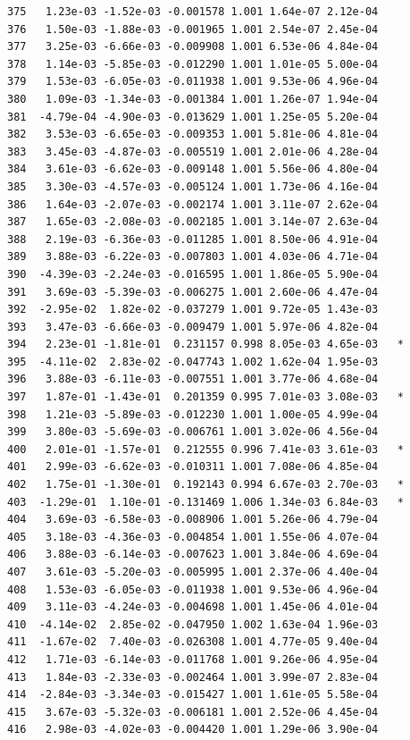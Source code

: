 \documentclass[
  letterpaper,
  DIV=11,
  numbers=noendperiod]{scrartcl}
\begin{document}
\begin{verbatim}
375   1.23e-03 -1.52e-03 -0.001578 1.001 1.64e-07 2.12e-04    
376   1.50e-03 -1.88e-03 -0.001965 1.001 2.54e-07 2.45e-04    
377   3.25e-03 -6.66e-03 -0.009908 1.001 6.53e-06 4.84e-04    
378   1.14e-03 -5.85e-03 -0.012290 1.001 1.01e-05 5.00e-04    
379   1.53e-03 -6.05e-03 -0.011938 1.001 9.53e-06 4.96e-04    
380   1.09e-03 -1.34e-03 -0.001384 1.001 1.26e-07 1.94e-04    
381  -4.79e-04 -4.90e-03 -0.013629 1.001 1.25e-05 5.20e-04    
382   3.53e-03 -6.65e-03 -0.009353 1.001 5.81e-06 4.81e-04    
383   3.45e-03 -4.87e-03 -0.005519 1.001 2.01e-06 4.28e-04    
384   3.61e-03 -6.62e-03 -0.009148 1.001 5.56e-06 4.80e-04    
385   3.30e-03 -4.57e-03 -0.005124 1.001 1.73e-06 4.16e-04    
386   1.64e-03 -2.07e-03 -0.002174 1.001 3.11e-07 2.62e-04    
387   1.65e-03 -2.08e-03 -0.002185 1.001 3.14e-07 2.63e-04    
388   2.19e-03 -6.36e-03 -0.011285 1.001 8.50e-06 4.91e-04    
389   3.88e-03 -6.22e-03 -0.007803 1.001 4.03e-06 4.71e-04    
390  -4.39e-03 -2.24e-03 -0.016595 1.001 1.86e-05 5.90e-04    
391   3.69e-03 -5.39e-03 -0.006275 1.001 2.60e-06 4.47e-04    
392  -2.95e-02  1.82e-02 -0.037279 1.001 9.72e-05 1.43e-03    
393   3.47e-03 -6.66e-03 -0.009479 1.001 5.97e-06 4.82e-04    
394   2.23e-01 -1.81e-01  0.231157 0.998 8.05e-03 4.65e-03   *
395  -4.11e-02  2.83e-02 -0.047743 1.002 1.62e-04 1.95e-03    
396   3.88e-03 -6.11e-03 -0.007551 1.001 3.77e-06 4.68e-04    
397   1.87e-01 -1.43e-01  0.201359 0.995 7.01e-03 3.08e-03   *
398   1.21e-03 -5.89e-03 -0.012230 1.001 1.00e-05 4.99e-04    
399   3.80e-03 -5.69e-03 -0.006761 1.001 3.02e-06 4.56e-04    
400   2.01e-01 -1.57e-01  0.212555 0.996 7.41e-03 3.61e-03   *
401   2.99e-03 -6.62e-03 -0.010311 1.001 7.08e-06 4.85e-04    
402   1.75e-01 -1.30e-01  0.192143 0.994 6.67e-03 2.70e-03   *
403  -1.29e-01  1.10e-01 -0.131469 1.006 1.34e-03 6.84e-03   *
404   3.69e-03 -6.58e-03 -0.008906 1.001 5.26e-06 4.79e-04    
405   3.18e-03 -4.36e-03 -0.004854 1.001 1.55e-06 4.07e-04    
406   3.88e-03 -6.14e-03 -0.007623 1.001 3.84e-06 4.69e-04    
407   3.61e-03 -5.20e-03 -0.005995 1.001 2.37e-06 4.40e-04    
408   1.53e-03 -6.05e-03 -0.011938 1.001 9.53e-06 4.96e-04    
409   3.11e-03 -4.24e-03 -0.004698 1.001 1.45e-06 4.01e-04    
410  -4.14e-02  2.85e-02 -0.047950 1.002 1.63e-04 1.96e-03    
411  -1.67e-02  7.40e-03 -0.026308 1.001 4.77e-05 9.40e-04    
412   1.71e-03 -6.14e-03 -0.011768 1.001 9.26e-06 4.95e-04    
413   1.84e-03 -2.33e-03 -0.002464 1.001 3.99e-07 2.83e-04    
414  -2.84e-03 -3.34e-03 -0.015427 1.001 1.61e-05 5.58e-04    
415   3.67e-03 -5.32e-03 -0.006181 1.001 2.52e-06 4.45e-04    
416   2.98e-03 -4.02e-03 -0.004420 1.001 1.29e-06 3.90e-04    

\end{verbatim}
\end{document}
